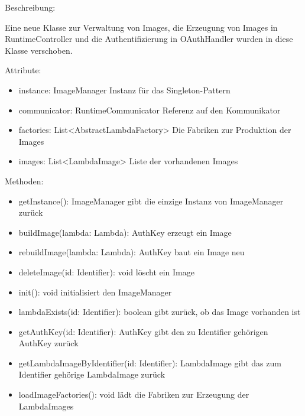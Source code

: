 \documentclass[a4paper,20pt,oneside]{book}
\begin{document}
	\vspace{0.5cm}
	\raggedright
	Beschreibung:
	
	Eine neue Klasse zur Verwaltung von Images, die Erzeugung von Images in RuntimeController und die Authentifizierung in OAuthHandler wurden in diese Klasse verschoben.
	
	\vspace{0.5cm}
	Attribute:
	\begin{itemize}
	\item instance: ImageManager
	\linebreak Instanz für das Singleton-Pattern
	\item communicator: RuntimeCommunicator
	\linebreak Referenz auf den Kommunikator
	\item factories: List<AbstractLambdaFactory>
	\linebreak Die Fabriken zur Produktion der Images
	\item images: List<LambdaImage>
	\linebreak Liste der vorhandenen Images
	\end{itemize}
	
	Methoden:
	\begin{itemize}
	\item getInstance(): ImageManager
	\linebreak gibt die einzige Instanz von ImageManager zurück
	\item buildImage(lambda: Lambda): AuthKey
	\linebreak erzeugt ein Image
	\item rebuildImage(lambda: Lambda): AuthKey
	\linebreak baut ein Image neu
	\item deleteImage(id: Identifier): void
	\linebreak löscht ein Image
	\item init(): void
	\linebreak initialisiert den ImageManager
	\item lambdaExists(id: Identifier): boolean
	\linebreak gibt zurück, ob das Image vorhanden ist
	\item getAuthKey(id: Identifier): AuthKey
	\linebreak gibt den zu Identifier gehörigen AuthKey zurück
	\item getLambdaImageByIdentifier(id: Identifier): LambdaImage
	\linebreak gibt das zum Identifier gehörige LambdaImage zurück
	\item loadImageFactories(): void
	\linebreak lädt die Fabriken zur Erzeugung der LambdaImages
	\end{itemize} 
	
\end{document}
